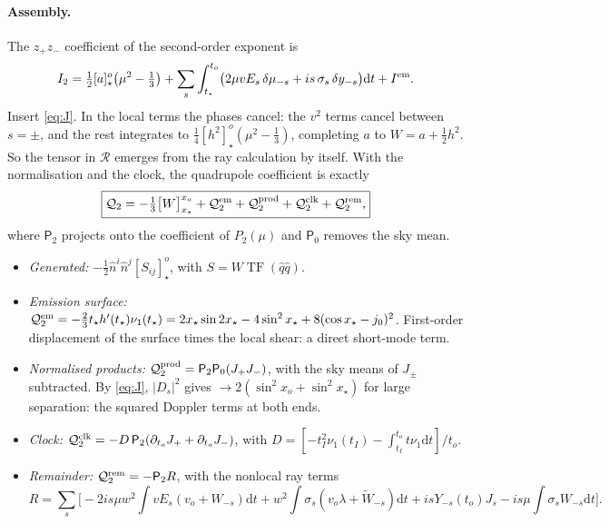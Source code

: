 \documentclass[10pt]{article}
\newcommand{\nh}{\hat n}
\newcommand{\dd}{\mathrm{d}}
\newcommand{\TF}{\operatorname{TF}}
\newcommand{\Q}{\mathcal Q_2}
\newcommand{\R}{\mathcal R}
\newcommand{\qh}{\hat q}
\begin{document}
\paragraph{Assembly.} The $z_+z_-$ coefficient of the second-order exponent is
\[
I_2=\tfrac12[a]^o_\star\big(\mu^2-\tfrac13\big)+\sum_s\int_{t_\star}^{t_o}\!\big(2\mu vE_s\,\delta\mu_{-s}+is\,\sigma_s\,\delta y_{-s}\big)\dd t+I^{\rm em}.
\]
Insert \eqref{eq:J}. In the local terms the phases cancel: the $v^2$ terms cancel between $s=\pm$, and the rest integrates to $\frac14[h^2]^o_\star(\mu^2-\frac13)$, completing $a$ to $W=a+\frac12h^2$. So the tensor in $\R$ emerges from the ray calculation by itself. With the normalisation and the clock, the quadrupole coefficient is exactly
\begin{equation}\label{eq:Q2}
\boxed{\Q=-\tfrac13\big[W\big]_{x_\star}^{x_o}+\Q^{\rm em}+\Q^{\rm prod}+\Q^{\rm clk}+\Q^{\rm rem},}
\end{equation}
where $\mathsf P_2$ projects onto the coefficient of $P_2(\mu)$ and $\mathsf P_0$ removes the sky mean.
\begin{itemize}
\item \emph{Generated:} $-\frac12\nh^i\nh^j[S_{ij}]_\star^o$, with $S=W\TF(\qh\qh)$.
\item \emph{Emission surface:} $\Q^{\rm em}=-\frac23t_\star h'(t_\star)\nu_1(t_\star)=2x_\star\sin2x_\star-4\sin^2x_\star+8(\cos x_\star-j_0)^2$. First-order displacement of the surface times the local shear: a direct short-mode term.
\item \emph{Normalised products:} $\Q^{\rm prod}=\mathsf P_2\mathsf P_0(J_+J_-)$, with the sky means of $J_\pm$ subtracted. By \eqref{eq:J}, $|D_s|^2$ gives $\to2(\sin^2x_o+\sin^2x_\star)$ for large separation: the squared Doppler terms at both ends.
\item \emph{Clock:} $\Q^{\rm clk}=-D\,\mathsf P_2(\partial_{t_o}J_++\partial_{t_o}J_-)$, with $D=[-t_I^2\nu_1(t_I)-\int_{t_I}^{t_o}t\nu_1\dd t]/t_o$.
\item \emph{Remainder:} $\Q^{\rm rem}=-\mathsf P_2R$, with the nonlocal ray terms
\begin{equation}\label{eq:rem}
R=\sum_s\Big[-2is\mu w^2\!\!\int\! vE_s(v_o+W_{-s})\dd t+w^2\!\!\int\!\sigma_s(v_o\lambda+\widetilde W_{-s})\dd t+isY_{-s}(t_o)J_s-is\mu\!\!\int\!\sigma_sW_{-s}\dd t\Big].
\end{equation}
\end{itemize}
\end{document}
